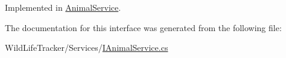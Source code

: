 Implemented in \hyperlink{classWildLifeTracker_1_1Services_1_1AnimalService_a993d3155da89897e5403799432be158b}{Animal\+Service}.



The documentation for this interface was generated from the following file\+:\begin{DoxyCompactItemize}
\item 
Wild\+Life\+Tracker/\+Services/\hyperlink{IAnimalService_8cs}{I\+Animal\+Service.\+cs}\end{DoxyCompactItemize}
